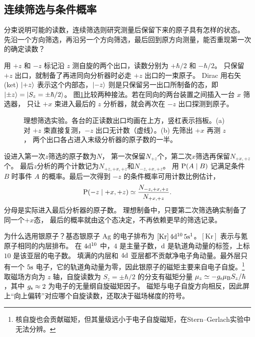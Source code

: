 \subsection{连续筛选与条件概率}
\label{ss:sg-sequence}

分束说明可能的读数，连续筛选则研究测量后保留下来的原子具有怎样的状态。
先沿一个方向筛选，再沿另一个方向筛选，最后回到原方向测量，能否重现第一次的确定读数？

用 $+z$ 和 $-z$ 标记沿 $z$ 测自旋的两个出口，读数分别为 $+\hbar/2$ 和 $-\hbar/2$。
只保留 $+z$ 出口，就制备了再进同向分析器时必走 $+z$ 出口的一束原子。
Dirac 用右矢(ket) $\ket{+z}$ 表示这个内部态，$\ket{-z}$ 则是只保留另一出口所制备的态，即 $\ket{\pm z} = \ket{S_z = \pm\hbar/2}$。
图\ref{fig:sg-filters}比较两种接法。若在同向的两台装置之间插入一台 $x$ 筛选器，
只让 $+x$ 束进入最后的 $z$ 分析器，就会再次在 $-z$ 出口探测到原子。

\begin{figure}[htbp]
    \centering
    \caption{理想筛选实验。各台的正读数出口均画在上方，竖杠表示挡板。(a) 对 $+z$ 束直接复测，$-z$ 出口无计数（虚线）。(b) 先筛出 $+x$ 再测 $z$，
        两个出口各占进入末级分析器的原子数的一半。}
    \label{fig:sg-filters}
\end{figure}

设进入第一次$z$筛选的原子数为$N$，
第一次保留$N_{+z}$个，第二次$x$筛选再保留$N_{+x,+z}$个。
最后$z$分析的两个计数记为$N_{+z,+x,+z}$和$N_{-z,+x,+z}$。
用 $\P(A \mid B)$ 记满足条件 $B$ 时事件 $A$ 的概率。最后一次得到 $-z$ 的条件概率可用计数比例估计，
\begin{equation}
    \P(-z \mid +x,+z)
    \simeq \frac{N_{-z,+x,+z}}{N_{+x,+z}}.
\end{equation}
分母是实际进入最后分析器的原子数。
理想制备中，只要第二次筛选确实制备了同一个$+x$态，
最后的概率就由这个态决定，不再依赖更早的筛选记录。


为什么选用银原子？基态银原子 $\mathrm{Ag}$ 的电子排布为 $[\mathrm{Kr}]\,4\orbitalD^{10}\,5\orbitalS^1$。$[\mathrm{Kr}]$ 表示与氪原子相同的内层排布。
在 $4\orbitalD^{10}$ 中，$4$ 是主量子数，$\orbitalD$ 是轨道角动量的标签，上标 $10$ 是该亚层的电子数。
填满的内层和 $4\orbitalD$ 亚层都不贡献净电子角动量。最外层只有一个 $5\orbitalS$ 电子，它的轨道角动量为零，因此银原子的磁矩主要来自电子自旋。\footnote{核自旋也会贡献磁矩，但其量级远小于电子自旋磁矩，在Stern--Gerlach实验中无法分辨。}
取磁场方向为 $z$ 轴，自旋读数为 $S_z = \pm\hbar/2$ 的分支有磁矩分量 $\mu_z \simeq -g_{\spin}\muB S_z/\hbar$，其中 $g_{\spin} \approx 2$ 为电子的无量纲自旋磁矩因子。
磁矩与电子自旋方向相反，因此屏上“向上偏转”对应哪个自旋读数，还取决于磁场梯度的符号。


